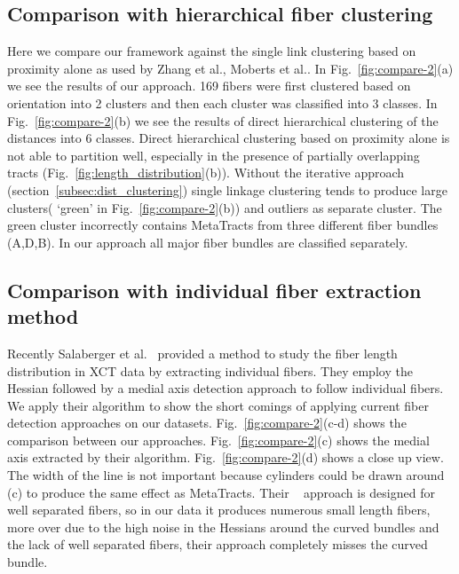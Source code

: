 \subsection {Comparison with hierarchical fiber clustering}
\label{subsec:compare}
Here we compare our framework against the single link clustering based on proximity alone as used by Zhang et al.\cite{Zhang2008}, Moberts et al.\cite{Moberts2005}. In Fig.~\ref{fig:compare-2}(a) we see the results of our approach. 169 fibers were first clustered based on orientation into 2 clusters and then each cluster was classified into 3 classes. In Fig.~\ref{fig:compare-2}(b) we see the results of direct hierarchical clustering of the distances into 6 classes. Direct hierarchical clustering based on proximity alone is not able to partition well, especially in the presence of partially overlapping tracts (Fig.~\ref{fig:length_distribution}(b)). Without the iterative approach (section~\ref{subsec:dist_clustering}) single linkage clustering tends to produce large clusters( `green' in Fig.~\ref{fig:compare-2}(b)) and outliers as separate cluster. The green cluster incorrectly contains MetaTracts from three different fiber bundles (A,D,B). In our approach all major fiber bundles are classified separately.

\subsection{Comparison with individual fiber extraction method}
 Recently  Salaberger et al.~\cite{Salaberger2011} provided a method to study the fiber length distribution in XCT data by extracting individual fibers. They employ the Hessian followed by a medial axis detection approach to follow  individual fibers. We apply their algorithm to show the short comings of applying current fiber detection approaches on our datasets. Fig.~\ref{fig:compare-2}(c-d) shows the comparison between our approaches. Fig.~\ref{fig:compare-2}(c) shows the medial axis extracted by their algorithm. Fig.~\ref{fig:compare-2}(d) shows a close up view. The width of the line is not important because cylinders could be drawn around (c) to produce the same effect as MetaTracts. Their ~\cite{Salaberger2011} approach is designed for well separated fibers, so in our data it produces numerous small length fibers, more over due to the high noise in the Hessians around the curved bundles and the lack of well separated fibers, their approach completely misses the curved bundle.
 




